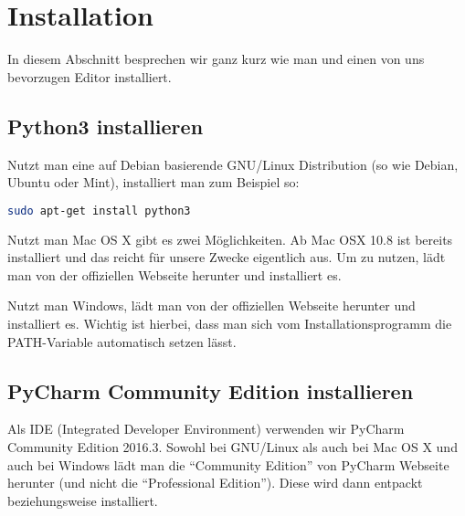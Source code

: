 \section{Installation}
\label{section:installation}
In diesem Abschnitt besprechen wir ganz kurz wie man \PythonDrei und einen von uns bevorzugen Editor installiert.

\subsection{Python3 installieren}
Nutzt man eine auf Debian basierende GNU/Linux Distribution (so wie Debian, Ubuntu oder Mint), installiert man \PythonDrei zum Beispiel so:
\begin{lstlisting}[language=bash]
sudo apt-get install python3
\end{lstlisting}

Nutzt man Mac OS X gibt es zwei Möglichkeiten.
Ab Mac OSX 10.8 ist \PythonZwei bereits installiert und das reicht für unsere Zwecke eigentlich aus.
Um \PythonDrei zu nutzen, lädt man \PythonDrei von der offiziellen Webseite \cite{PythonWebseite} herunter und installiert es.

Nutzt man Windows, lädt man \PythonDrei von der offiziellen Webseite \cite{PythonWebseite} herunter und installiert es.
Wichtig ist hierbei, dass man sich vom Installationsprogramm die PATH-Variable automatisch setzen lässt.

\subsection{PyCharm Community Edition installieren}
Als IDE (Integrated Developer Environment) verwenden wir PyCharm Community Edition 2016.3.
Sowohl bei GNU/Linux als auch bei Mac OS X und auch bei Windows lädt man die ``Community Edition'' von PyCharm Webseite \cite{pycharm} herunter (und nicht die ``Professional Edition'').
Diese wird dann entpackt beziehungsweise installiert.
